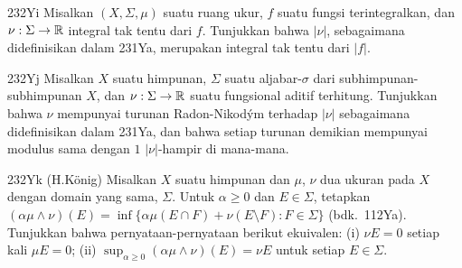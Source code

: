 {\spheader 232Yi Misalkan $(X,\Sigma,\mu)$ suatu ruang ukur, $f$ suatu
fungsi terintegralkan, dan $\nu:\Sigma\to\Bbb R$ integral tak tentu dari
$f$. Tunjukkan bahwa $|\nu|$, sebagaimana didefinisikan dalam 231Ya,
merupakan integral tak tentu dari $|f|$.

\spheader 232Yj Misalkan $X$ suatu himpunan, $\Sigma$ suatu
aljabar-$\sigma$ dari subhimpunan-subhimpunan $X$, dan
$\nu:\Sigma\to\Bbb R$ suatu fungsional aditif terhitung. Tunjukkan bahwa
$\nu$ mempunyai turunan Radon-Nikod\'ym terhadap $|\nu|$ sebagaimana
didefinisikan dalam 231Ya, dan bahwa setiap turunan demikian mempunyai
modulus sama dengan $1\,\,|\nu|$-hampir di mana-mana.

\spheader 232Yk (H.K\"onig)
Misalkan $X$ suatu himpunan dan $\mu$, $\nu$ dua ukuran pada $X$ dengan
domain yang sama, $\Sigma$. Untuk $\alpha\ge 0$ dan $E\in\Sigma$,
tetapkan $(\alpha\mu\wedge\nu)(E)
=\inf\{\alpha\mu(E\cap F)+\nu(E\setminus F):F\in\Sigma\}$ (bdk.\
112Ya).
Tunjukkan bahwa pernyataan-pernyataan berikut ekuivalen: (i) $\nu E=0$
setiap kali $\mu E=0$; (ii)
$\sup_{\alpha\ge 0}(\alpha\mu\wedge\nu)(E)=\nu E$ untuk setiap
$E\in\Sigma$.
}%

